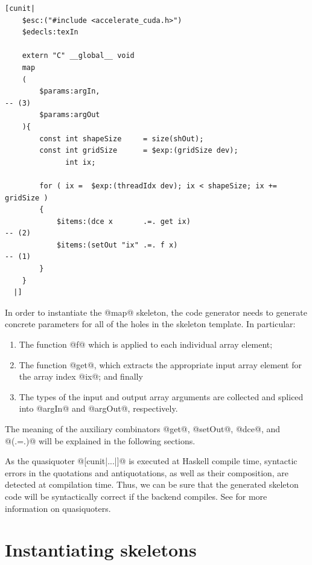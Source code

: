 \begin{lstlisting}[style=haskell,
    float,
    name=map_skeleton,
    label=lst:map_skeleton,
    caption={Accelerate CUDA skeleton for the \code{map} operation}]
[cunit|
    $esc:("#include <accelerate_cuda.h>")
    $edecls:texIn

    extern "C" __global__ void
    map
    (
        $params:argIn,                                                                 -- (3)
        $params:argOut
    ){
        const int shapeSize     = size(shOut);
        const int gridSize      = $exp:(gridSize dev);
              int ix;

        for ( ix =  $exp:(threadIdx dev); ix < shapeSize; ix += gridSize )
        {
            $items:(dce x       .=. get ix)                                            -- (2)
            $items:(setOut "ix" .=. f x)                                               -- (1)
        }
    }
  |]
\end{lstlisting}

In order to instantiate the @map@ skeleton, the code generator needs to
generate concrete parameters for all of the holes in the skeleton template. In
particular:
%
\begin{enumerate}
\item The function @f@ which is applied to each individual array element;

\item The function @get@, which extracts the appropriate input array
    element for the array index @ix@; and finally

\item The types of the input and output array arguments are collected and
    spliced into @argIn@ and @argOut@, respectively.

\end{enumerate}
%
The meaning of the auxiliary combinators @get@, @setOut@, @dce@, and @(.=.)@
will be explained in the following sections.

As the quasiquoter @[cunit|...|]@ is executed at Haskell compile time,
syntactic errors in the quotations and antiquotations, as well as their
composition, are detected at compilation time. Thus, we can be sure that the
generated skeleton code will be syntactically correct if the backend compiles.
See \cite{Mainland:2007bl} for more information on quasiquoters.


\section{Instantiating skeletons}
\label{sec:instantiating_skeletons}

